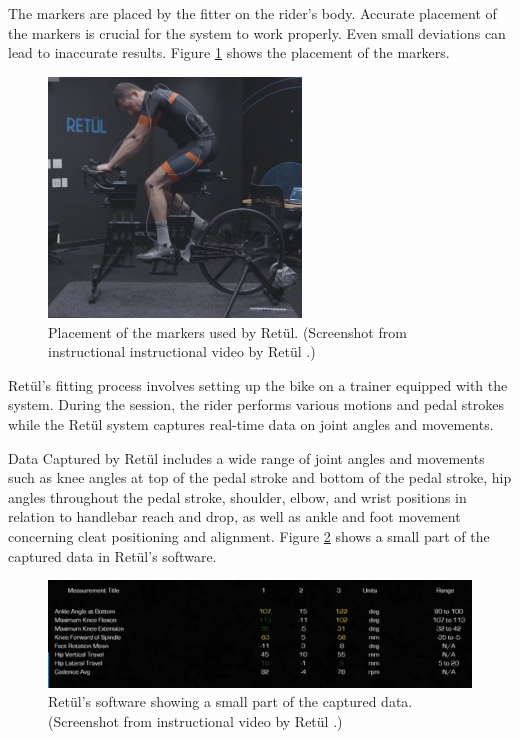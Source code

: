 The markers are placed by the fitter on the rider's body. Accurate placement of the markers is crucial for the system to work properly. Even small deviations can lead to inaccurate results. Figure \ref{fig:retul_markers} shows the placement of the markers.

\begin{figure}[htb]
    \centering
    \includegraphics[width=0.6\textwidth]{obrazky-figures/retul_markers.jpg}
    \caption{Placement of the markers used by Retül. (Screenshot from instructional instructional video by Retül \cite{retulMarkersYoutube}.)}
    \label{fig:retul_markers}
\end{figure}

Retül's fitting process involves setting up the bike on a trainer equipped with the system. During the session, the rider performs various motions and pedal strokes while the Retül system captures real-time data on joint angles and movements.

Data Captured by Retül includes a wide range of joint angles and movements such as knee angles at top of the pedal stroke and bottom of the pedal stroke, hip angles throughout the pedal stroke, shoulder, elbow, and wrist positions in relation to handlebar reach and drop, as well as ankle and foot movement concerning cleat positioning and alignment. Figure \ref{fig:retul_app} shows a small part of the captured data in Retül's software.

\begin{figure}[htb]
    \centering
    \includegraphics[width=\textwidth]{obrazky-figures/retul_app_crop.png}
    \caption{Retül's software showing a small part of the captured data. (Screenshot from  instructional video by Retül \cite{retulScreenYoutube}.)}
    \label{fig:retul_app}
\end{figure}

